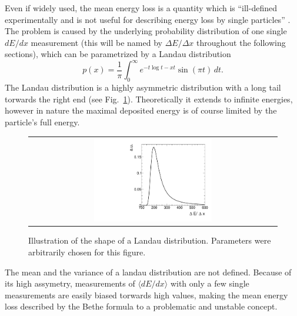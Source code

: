 Even if widely used, the mean energy loss is a quantity which is ``ill-defined experimentally and is not useful for describing energy loss by single particles'' \cite{bib:PDG_2014}.
The problem is caused by the underlying probability distribution of one single $dE/dx$ measurement (this will be named by $\Delta E/ \Delta x $ throughout the following sections), which can be parametrized by a Landau distribution \cite{bib:Landau_1944}
\begin{equation*}
p(x) = \frac{1}{\pi} \int_0^\infty\! e^{-t \log t - x t} \sin(\pi t)\, dt.
\end{equation*}
The Landau distribution is a highly asymmetric distribution with a long tail torwards the right end (see Fig.~\ref{fig:landau}).
Theoretically it extends to infinite energies, however in nature the maximal deposited energy is of course limited by the particle's full energy.
\begin{figure}[!t]
  \centering 
  \begin{tabular}{c}
  \includegraphics[width=0.49\textwidth]{figures/analysis/Landau.pdf}
  \end{tabular}
  \caption{Illustration of the shape of a Landau distribution. Parameters were arbitrarily chosen for this figure.} 
  \label{fig:landau}
\end{figure}
The mean and the variance of a landau distribution are not defined.
Because of its high assymetry, measurements of $\langle dE/dx \rangle$ with only a few single measurements are easily biased torwards high values, making the mean energy loss described by the Bethe formula to a problematic and unstable concept. 


